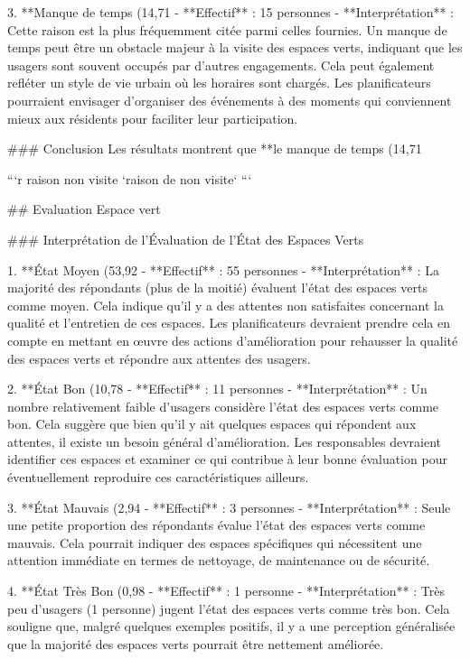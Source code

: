 3. **Manque de temps (14,71%
   - **Effectif** : 15 personnes
   - **Interprétation** : Cette raison est la plus fréquemment citée parmi celles fournies. Un manque de temps peut être un obstacle majeur à la visite des espaces verts, indiquant que les usagers sont souvent occupés par d'autres engagements. Cela peut également refléter un style de vie urbain où les horaires sont chargés. Les planificateurs pourraient envisager d'organiser des événements à des moments qui conviennent mieux aux résidents pour faciliter leur participation.

### Conclusion
Les résultats montrent que **le manque de temps (14,71%

```{r raison non visite}
`raison de non visite`
```

## Evaluation Espace vert

### Interprétation de l'Évaluation de l'État des Espaces Verts

1. **État Moyen (53,92%
   - **Effectif** : 55 personnes
   - **Interprétation** : La majorité des répondants (plus de la moitié) évaluent l'état des espaces verts comme moyen. Cela indique qu'il y a des attentes non satisfaites concernant la qualité et l'entretien de ces espaces. Les planificateurs devraient prendre cela en compte en mettant en œuvre des actions d'amélioration pour rehausser la qualité des espaces verts et répondre aux attentes des usagers.

2. **État Bon (10,78%
   - **Effectif** : 11 personnes
   - **Interprétation** : Un nombre relativement faible d'usagers considère l'état des espaces verts comme bon. Cela suggère que bien qu'il y ait quelques espaces qui répondent aux attentes, il existe un besoin général d'amélioration. Les responsables devraient identifier ces espaces et examiner ce qui contribue à leur bonne évaluation pour éventuellement reproduire ces caractéristiques ailleurs.

3. **État Mauvais (2,94%
   - **Effectif** : 3 personnes
   - **Interprétation** : Seule une petite proportion des répondants évalue l'état des espaces verts comme mauvais. Cela pourrait indiquer des espaces spécifiques qui nécessitent une attention immédiate en termes de nettoyage, de maintenance ou de sécurité.

4. **État Très Bon (0,98%
   - **Effectif** : 1 personne
   - **Interprétation** : Très peu d'usagers (1 personne) jugent l'état des espaces verts comme très bon. Cela souligne que, malgré quelques exemples positifs, il y a une perception généralisée que la majorité des espaces verts pourrait être nettement améliorée.

